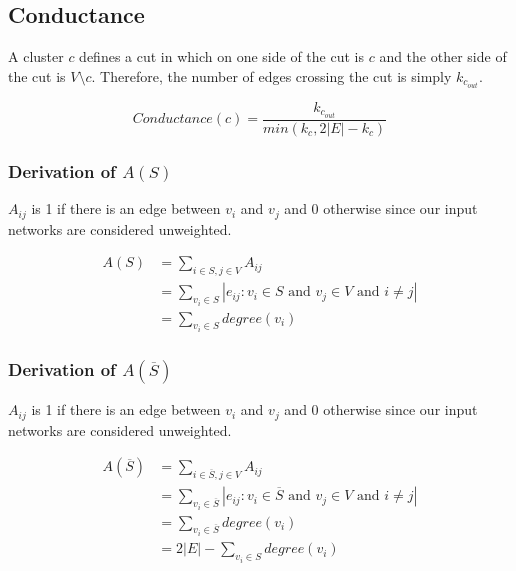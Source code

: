 \documentclass[aps,pre,superscriptaddress]{article}
\begin{document}
\subsection{Conductance}
A cluster $c$ defines a cut in which on one side of the cut is $c$ and the other side of the cut is $V \setminus c$. Therefore, the number of edges crossing the cut is simply $k_{c_{out}}$.


\begin{equation}
	Conductance(c) = \frac{k_{c_{out}}}{min(k_{c}, 2|E|-k_{c})}
\end{equation}

\subsubsection{Derivation of $A(S)$}
$A_{ij}$ is 1 if there is an edge between $v_{i}$ and $v_{j}$ and 0 otherwise since our input networks are considered unweighted.

\begin{align}
	A(S) & = \sum_{i \in S,j\in V}{A_{ij}}                                                                \\
	     & = \sum_{v_{i} \in S}{|{e_{ij} : v_{i} \in S \text{ and } v_{j} \in V \text { and } i \neq j}|} \\
	     & = \sum_{v_{i} \in S}{degree(v_{i})}
\end{align}

\subsubsection{Derivation of $A(\overline{S})$}
$A_{ij}$ is 1 if there is an edge between $v_{i}$ and $v_{j}$ and 0 otherwise since our input networks are considered unweighted.

\begin{align}
	A(\overline{S}) & = \sum_{i \in \overline{S},j\in V}{A_{ij}}                                                                           \\
	                & = \sum_{v_{i} \in \overline{S}}{|{e_{ij} : v_{i} \in \overline{S} \text{ and } v_{j} \in V \text { and } i \neq j}|} \\
	                & = \sum_{v_{i} \in \overline{S}}{degree(v_{i})}                                                                       \\
	                & = 2|E| - \sum_{v_{i} \in S}{degree(v_{i})}
\end{align}
\end{document}
